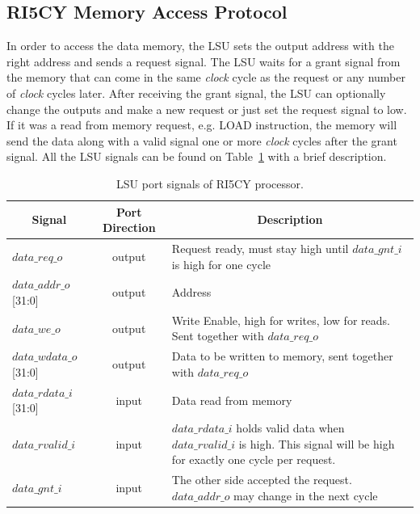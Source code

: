 \subsection*{RI5CY Memory Access Protocol}

In order to access the data memory, the LSU sets the output address with the right address and sends a request signal. The LSU waits for a grant signal from the memory that can come in the same \textit{clock} cycle as the request or any number of \textit{clock} cycles later. After receiving the grant signal, the LSU can optionally change the outputs and make a new request or just set the request signal to low. If it was a read from memory request, e.g. LOAD instruction, the memory will send the data along with a valid signal one or more \textit{clock} cycles after the grant signal. All the LSU signals can be found on Table~\ref{tab:lsu-signals} with a brief description. 

\begin{table}[htb!] 
	\centering 
	\caption{LSU port signals of RI5CY processor\cite{manual-ri5cy}.} 
	\label{tab:lsu-signals}
	\begin{tabular}{l|c|p{7cm}} 
		\multicolumn{1}{c}{\bfseries Signal} & \multicolumn{1}{c}{\bfseries Port Direction} & \multicolumn{1}{c}{\bfseries Description} \\     
		\hline	
		$data\_req\_o$  &  output & Request ready, must stay high until $data\_gnt\_i$ is        high for one cycle \\
		\hline
		$data\_addr\_o$[31:0]  &  output & Address \\
		\hline
		$data\_we\_o$  &  output & Write Enable, high for writes, low for reads. Sent            together with $data\_req\_o$ \\
		\hline
		$data\_wdata\_o$[31:0]  &  output & Data to be written to memory, sent together with     $data\_req\_o$ \\
		\hline
		$data\_rdata\_i$[31:0]  &  input & Data read from memory \\
		\hline
		$data\_rvalid\_i$  &  input & $data\_rdata\_i$ holds valid data when                     $data\_rvalid\_i$ is high. This signal will be high for exactly one cycle per        request. \\
		\hline
		$data\_gnt\_i$  &  input & The other side accepted the request. $data\_addr\_o$ may     change in the next cycle \\
		\hline
	\end{tabular} 
\end{table}

